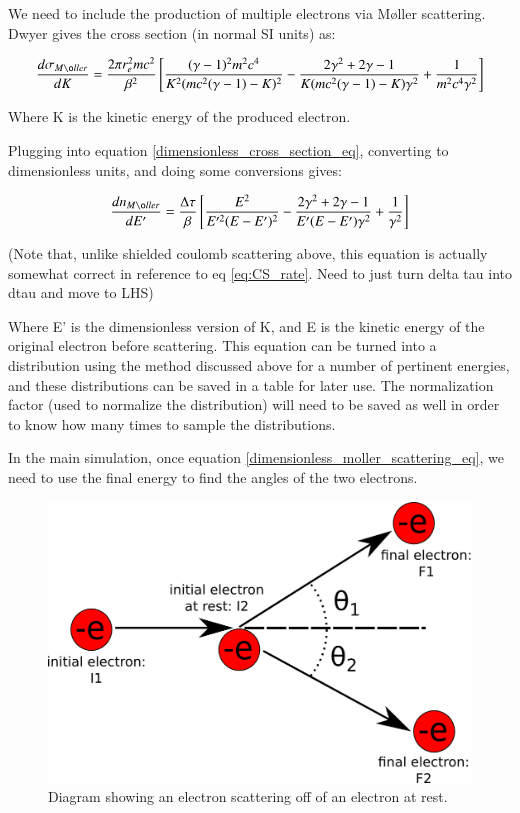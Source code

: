 \documentclass[]{article}
\begin{document}
We need to include the production of multiple electrons via M\o ller scattering. Dwyer gives the cross section (in normal SI units) as:

\begin{equation} 
\frac{d\sigma_{M\o ller}}{d K} = \frac{2\pi r_e^2 m c^2}{\beta^2}\left[  \frac{(\gamma-1)^2m^2c^4}{K^2(mc^2(\gamma-1)-K)^2} - \frac{2\gamma^2 + 2\gamma -1}{K(mc^2(\gamma-1)-K)\gamma^2}  + \frac{1}{m^2c^4\gamma^2}  \right]
\end{equation}

Where K is the kinetic energy of the produced electron.

Plugging into equation \ref{dimensionless_cross_section_eq}, converting to dimensionless units, and doing some conversions gives:

\begin{equation} 
\label{dimensionless_moller_scattering_eq}
\frac{dn_{M\o ller}}{d E'} = \frac{\Delta \tau}{\beta}\left[  \frac{E^2}{E'^2(E-E')^2} - \frac{2\gamma^2 + 2\gamma -1}{E'(E-E')\gamma^2}  + \frac{1}{\gamma^2}  \right]
\end{equation}

(Note that, unlike shielded coulomb scattering above, this equation is actually somewhat correct in reference to eq \ref{eq:CS_rate}. Need to just turn delta tau into dtau and move to LHS)

Where E' is the dimensionless version of K, and E is the kinetic energy of the original electron before scattering. This equation can be turned into a distribution using the method discussed above for a number of pertinent energies, and these distributions can be saved in a table for later use. The normalization factor (used to normalize the distribution) will need to be saved as well in order to know how many times to sample the distributions.

In the main simulation, once equation \ref{dimensionless_moller_scattering_eq}, we need to use the final energy to find the angles of the two electrons.

\begin{figure}
\centering
\includegraphics[width=0.7\linewidth]{./figures/moller_kinematics/scattering_kinematics}
\caption{Diagram showing an electron scattering off of an electron at rest.}
\label{scattering_kin_fig}
\end{figure}
\end{document}
